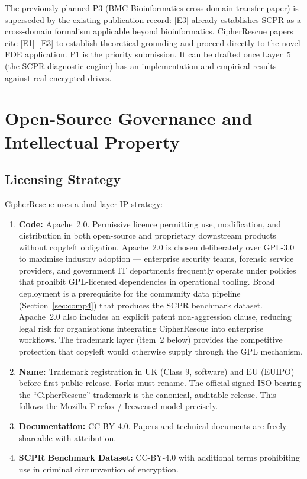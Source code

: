 \documentclass[11pt,a4paper]{report}
\begin{document}
The previously planned P3 (BMC Bioinformatics cross-domain transfer paper) is superseded by the existing publication record: [E3] already establishes SCPR as a cross-domain formalism applicable beyond bioinformatics. CipherRescue papers cite [E1]--[E3] to establish theoretical grounding and proceed directly to the novel FDE application. P1 is the priority submission. It can be drafted once Layer~5 (the SCPR diagnostic engine) has an implementation and empirical results against real encrypted drives.

\chapter{Open-Source Governance and Intellectual Property}

\section{Licensing Strategy}

CipherRescue uses a dual-layer IP strategy:

\begin{enumerate}
  \item \textbf{Code:} Apache~2.0. Permissive licence permitting use, modification, and distribution in both open-source and proprietary downstream products without copyleft obligation. Apache~2.0 is chosen deliberately over GPL-3.0 to maximise industry adoption --- enterprise security teams, forensic service providers, and government IT departments frequently operate under policies that prohibit GPL-licensed dependencies in operational tooling. Broad deployment is a prerequisite for the community data pipeline (Section~\ref{sec:comp4}) that produces the SCPR benchmark dataset. Apache~2.0 also includes an explicit patent non-aggression clause, reducing legal risk for organisations integrating CipherRescue into enterprise workflows. The trademark layer (item~2 below) provides the competitive protection that copyleft would otherwise supply through the GPL mechanism.
  \item \textbf{Name:} Trademark registration in UK (Class 9, software) and EU (EUIPO) before first public release. Forks must rename. The official signed ISO bearing the ``CipherRescue'' trademark is the canonical, auditable release. This follows the Mozilla Firefox / Iceweasel model precisely.
  \item \textbf{Documentation:} CC-BY-4.0. Papers and technical documents are freely shareable with attribution.
  \item \textbf{SCPR Benchmark Dataset:} CC-BY-4.0 with additional terms prohibiting use in criminal circumvention of encryption.
\end{enumerate}
\end{document}
